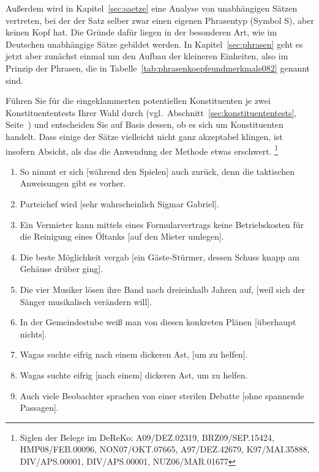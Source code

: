 Außerdem wird in Kapitel~\ref{sec:saetze} eine Analyse von unabhängigen Sätzen vertreten, bei der der Satz selber zwar einen eigenen Phrasentyp (\zB Symbol S), aber keinen Kopf hat.
Die Gründe dafür liegen in der besonderen Art, wie im Deutschen unabhängige Sätze gebildet werden.
In Kapitel~\ref{sec:phrasen} geht es jetzt aber zunächst einmal um den Aufbau der kleineren Einheiten, also im Prinzip der Phrasen, die in Tabelle~\ref{tab:phrasenkoepfeundmerkmale082} genannt sind.


\Uebungen

 \label{exc:konstituentenstruktur01} Führen Sie für die eingeklammerten potentiellen Konstituenten je zwei Konstituententests Ihrer Wahl durch (vgl.\ Abschnitt~\ref{sec:konstituententests}, Seite~\pageref{sec:konstituententests}) und entscheiden Sie auf Basis dessen, ob es sich um Konstituenten handelt.
Dass einige der Sätze vielleicht nicht ganz akzeptabel klingen, ist insofern Absicht, als das die Anwendung der Methode etwas erschwert.%
\footnote{Siglen der Belege im DeReKo: A09\slash DEZ.02319, BRZ09\slash SEP.15424, HMP08\slash FEB.00096, NON07\slash OKT.07665, A97\slash DEZ.42679, K97\slash MAI.35888, DIV\slash APS.00001, DIV\slash APS.00001, NUZ06\slash MAR.01677}

\begin{enumerate}
  \item So nimmt er sich [während den Spielen] auch zurück, denn die taktischen Anweisungen gibt es vorher.
  \item Parteichef wird [sehr wahrscheinlich Sigmar Gabriel].
  \item Ein Vermieter kann mittels eines Formularvertrags keine Betriebskosten für die Reinigung eines Öltanks [auf den Mieter umlegen].
  \item Die beste Möglichkeit vergab [ein Gäste-Stürmer, dessen Schuss knapp am Gehäuse drüber ging].
  \item Die vier Musiker lösen ihre Band nach dreieinhalb Jahren auf, [weil sich der Sänger musikalisch verändern will].
  \item In der Gemeindestube weiß man von diesen konkreten Plänen [überhaupt nichts].
  \item Wagas suchte eifrig nach einem dickeren Ast, [um zu helfen].
  \item Wagas suchte eifrig [nach einem] dickeren Ast, um zu helfen.
  \item Auch viele Beobachter sprachen von einer sterilen Debatte [ohne spannende Passagen].
\end{enumerate}

